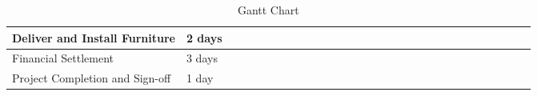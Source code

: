\begin{table}[!h]
{\begin{tabular}{|l|l|l|l|l|l|l|l|l|l|l|l|l|l|l|l|l|l|l|l|l|l|l|l|l|l|l|l|l|}
            Deliver and Install Furniture    & 2 days  &                          &                          &                          &                          &                          &                          &                          &                          &                          &                          &                          &                          &                          &                          &                          &                          &                          &                          &                          &                          &                          &                          & \cellcolor[HTML]{FD6864} & \cellcolor[HTML]{FD6864} &                          &                          &                          \\ \hline
            Financial Settlement             & 3 days  &                          &                          &                          &                          &                          &                          &                          &                          &                          &                          &                          &                          &                          &                          &                          &                          &                          &                          &                          &                          &                          &                          &                          &                          & \cellcolor[HTML]{FD6864} & \cellcolor[HTML]{FD6864} &                          \\ \hline
            Project Completion and Sign-off  & 1 day   &                          &                          &                          &                          &                          &                          &                          &                          &                          &                          &                          &                          &                          &                          &                          &                          &                          &                          &                          &                          &                          &                          &                          &                          &                          &                          & \cellcolor[HTML]{FD6864} \\ \hline
        \end{tabular}
    }
    \caption{Gantt Chart}
    \label{table:gantt_chart}
\end{table}
\newpage

